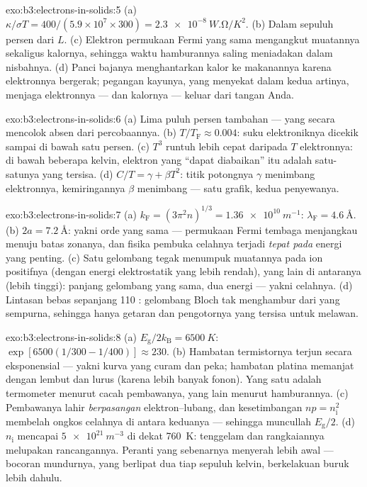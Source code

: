 \begin{solution}{exo:b3:electrons-in-solids:5}
(a) $\kappa/\sigma T = 400/(5.9\times10^7\times300) =
\qty{2.3e-8}{W.\ohm/K^2}$. (b) Dalam sepuluh persen dari $L$. (c)
Elektron permukaan Fermi yang sama mengangkut muatannya sekaligus
kalornya, sehingga waktu hamburannya saling meniadakan dalam nisbahnya. (d) Panci
bajanya menghantarkan kalor ke makanannya karena elektronnya bergerak;
pegangan kayunya, yang menyekat dalam kedua artinya, menjaga elektronnya ---
dan kalornya --- keluar dari tangan Anda.
\end{solution}

\begin{solution}{exo:b3:electrons-in-solids:6}
(a) Lima puluh persen tambahan --- yang secara mencolok absen dari percobaannya.
(b) $T/T_{\text{F}} \approx 0.004$: suku elektroniknya
dicekik sampai di bawah satu persen. (c) $T^3$  runtuh
lebih cepat daripada $T$ elektronnya: di bawah beberapa kelvin, elektron
yang ``dapat diabaikan'' itu adalah satu-satunya yang tersisa. (d) $C/T =
\gamma + \beta T^2$: titik potongnya $\gamma$ menimbang elektronnya,
kemiringannya $\beta$ menimbang  --- satu grafik, kedua penyewanya.
\end{solution}

\begin{solution}{exo:b3:electrons-in-solids:7}
(a) $k_{\text{F}} = (3\pi^2n)^{1/3} = \qty{1.36e10}{m^{-1}}$:
$\lambda_{\text{F}} = \qty{4.6}{\angstrom}$. (b) $2a =
\qty{7.2}{\angstrom}$: yakni orde yang sama --- permukaan Fermi tembaga
menjangkau menuju batas zonanya, dan fisika pembuka celahnya
terjadi \emph{tepat pada} energi yang penting. (c) Satu gelombang tegak
menumpuk muatannya pada ion positifnya (dengan energi elektrostatik yang
lebih rendah), yang lain di antaranya (lebih tinggi): panjang gelombang
yang sama, dua energi --- yakni celahnya. (d) Lintasan bebas sepanjang 110
: gelombang Bloch tak menghambur dari  yang sempurna,
sehingga hanya getaran dan pengotornya yang tersisa untuk melawan.
\end{solution}

\begin{solution}{exo:b3:electrons-in-solids:8}
(a) $E_{\text{g}}/2k_{\text{B}} = \qty{6500}{K}$:
$\exp[6500(1/300 - 1/400)] \approx 230$. (b) Hambatan termistornya
terjun secara eksponensial --- yakni kurva yang curam dan peka;
hambatan platina memanjat dengan lembut dan lurus (karena lebih banyak fonon). Yang satu adalah
termometer menurut cacah pembawanya, yang lain menurut hamburannya. (c)
Pembawanya lahir \emph{berpasangan} elektron--lubang, dan
kesetimbangan $np = n_{\text{i}}^2$ membelah ongkos celahnya di antara
keduanya --- sehingga muncullah $E_{\text{g}}/2$. (d)
$n_{\text{i}}$ mencapai $\qty{5e21}{m^{-3}}$ di dekat \qty{760}{K}:
 tenggelam dan rangkaiannya melupakan rancangannya. Peranti
yang sebenarnya menyerah lebih awal --- bocoran mundurnya, yang berlipat dua tiap
sepuluh kelvin, berkelakuan buruk lebih dahulu.
\end{solution}


